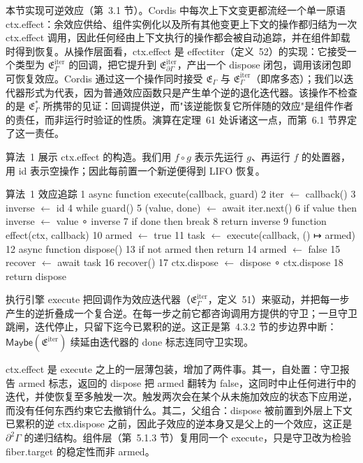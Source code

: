 本节实现可逆效应（第~3.1 节）。Cordis 中每次上下文变更都流经一个单一原语 ctx.effect：余效应供给、组件实例化以及所有其他变更上下文的操作都归结为一次 ctx.effect 调用，因此任何经由上下文执行的操作都会被自动追踪，并在组件卸载时得到恢复。从操作层面看，ctx.effect 是 effectiter（定义~52）的实现：它接受一个类型为 \({ \mathfrak { E } } _ { \Gamma } ^ { \mathrm { i t e r } }\) 的回调，把它提升到 \({ \mathfrak { E } } _ { \partial \Gamma } ^ { \mathrm { i t e r } }\)，产出一个 dispose 闭包，调用该闭包即可恢复效应。Cordis 通过这一个操作同时接受 \(\mathfrak { E } _ { \Gamma }\) 与 \({ \mathfrak { E } } _ { \Gamma } ^ { \mathrm { i t e r } }\)（即席多态）；我们以迭代器形式为代表，因为普通效应函数只是产生单个逆的退化迭代器。该操作不检查的是 \({ \mathfrak { E } } _ { \Gamma } ^ { * }\) 所携带的见证：回调提供逆，而"该逆能恢复它所伴随的效应"是组件作者的责任，而非运行时验证的性质。演算在定理~61 处诉诸这一点，而第~6.1 节界定了这一责任。

算法~1 展示 ctx.effect 的构造。我们用 \(f \circ g\) 表示先运行 \(g\)、再运行 \(f\) 的处置器，用 id 表示空操作；因此每前置一个新逆便得到 LIFO 恢复。

算法~1 效应追踪
1 async function execute(callback, guard)
2 iter $\leftarrow$ callback()
3 inverse $\leftarrow$ id
4 while guard()
5 (value, done) $\leftarrow$ await iter.next()
6 if value then inverse $\leftarrow$ value ∘ inverse
7 if done then break
8 return inverse
9 function effect(ctx, callback)
10 armed $\leftarrow$ true
11 task $\leftarrow$ execute(callback, () ↦ armed)
12 async function dispose()
13 if not armed then return
14 armed $\leftarrow$ false
15 recover $\leftarrow$ await task
16 recover()
17 ctx.dispose $\leftarrow$ dispose ∘ ctx.dispose
18 return dispose

执行引擎 execute 把回调作为效应迭代器（\( \mathfrak { E } _ { \Gamma } ^ { \mathrm { i t e r } }\)，定义~51）来驱动，并把每一步产生的逆折叠成一个复合逆。在每一步之前它都咨询调用方提供的守卫；一旦守卫跳闸，迭代停止，只留下迄今已累积的逆。这正是第~4.3.2 节的步边界中断：\(\mathsf{Maybe}( \mathfrak { E } ^ { \mathrm { i t e r } } )\) 续延由迭代器的 done 标志连同守卫实现。

ctx.effect 是 execute 之上的一层薄包装，增加了两件事。其一，自处置：守卫报告 armed 标志，返回的 dispose 把 armed 翻转为 false，这同时中止任何进行中的迭代，并使恢复至多触发一次。触发两次会在某个从未施加效应的状态下应用逆，而没有任何东西约束它去撤销什么。其二，父组合：dispose 被前置到外层上下文已累积的逆 ctx.dispose 之前，因此子效应的逆本身又是父上的一个效应，这正是 \(\partial ^ { 2 } \Gamma\) 的递归结构。组件层（第~5.1.3 节）复用同一个 execute，只是守卫改为检验 fiber.target 的稳定性而非 armed。

